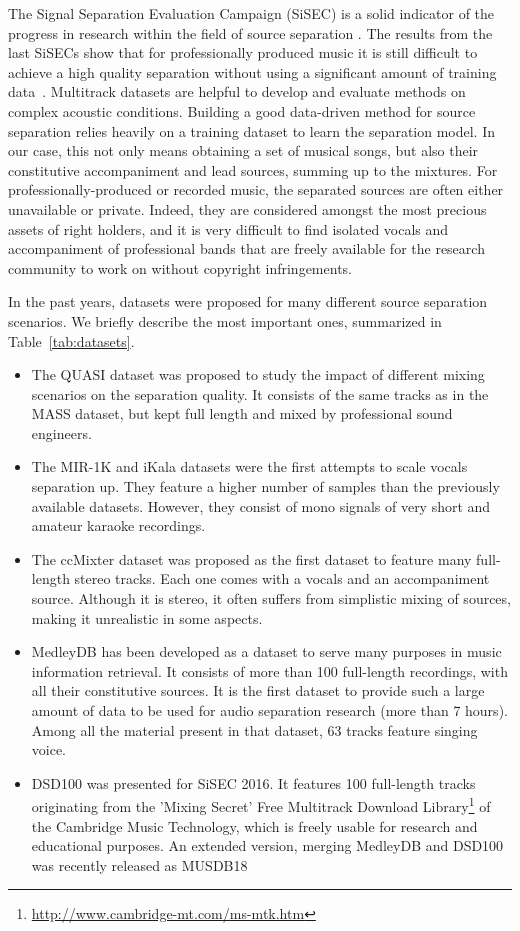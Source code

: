 The Signal Separation Evaluation Campaign (SiSEC) is a solid indicator of the progress in research within the field of source separation \cite{vincent12}. The results from the last SiSECs show that for professionally produced music it is still difficult to achieve a high quality separation without using a significant amount of training data~\cite{sisec13, ono15, liutkus17, stoeter18sisec}.
Multitrack datasets are helpful to develop and evaluate methods on complex acoustic conditions.
Building a good data-driven method for source separation relies heavily on a training dataset to learn the separation model. In our case, this not only means obtaining a set of musical songs, but also their constitutive accompaniment and lead sources, summing up to the mixtures. For professionally-produced or recorded music, the separated sources are often either unavailable or private. Indeed, they are considered amongst the most precious assets of right holders, and it is very difficult to find isolated vocals and accompaniment of professional bands that are freely available for the research community to work on without copyright infringements.
\par
In the past years, datasets were proposed for many different source separation scenarios. We briefly describe the most important ones, summarized in Table~\ref{tab:datasets}. 

\begin{itemize}[leftmargin=*]
	\item The QUASI dataset was proposed to study the impact of different mixing scenarios on the separation quality. It  consists of the same tracks as in the MASS dataset, but kept full length and mixed by professional sound engineers.
	\item The MIR-1K and iKala datasets were the first attempts to scale vocals separation up. They feature a higher number of samples than the previously available datasets. However, they consist of mono signals of very short and amateur karaoke recordings.
	\item The ccMixter dataset was proposed as the first dataset to feature many full-length stereo tracks. Each one comes with a vocals and an accompaniment source. Although it is stereo, it often suffers from simplistic mixing of sources, making it unrealistic in some aspects.
	\item MedleyDB has been developed as a dataset to serve many purposes in music information retrieval. It consists of more than 100 full-length recordings, with all their constitutive sources. It is the first dataset to provide such a large amount of data to be used for audio separation research (more than 7 hours). Among all the material present in that dataset, 63 tracks feature singing voice.
  \item DSD100 was presented for SiSEC 2016. It features 100 full-length tracks originating from the 'Mixing Secret' Free Multitrack Download Library\footnote{\url{http://www.cambridge-mt.com/ms-mtk.htm}} of the Cambridge Music Technology, which is freely usable for research and educational purposes. An extended version, merging MedleyDB and DSD100 was recently released as MUSDB18~\cite{rafii17}
\end{itemize}

